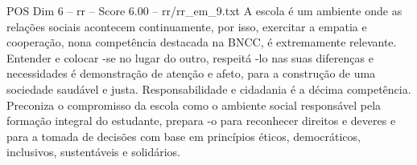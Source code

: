\begin{textsample}{POS Dim 6 – rr – Score 6.00 – rr/rr\_em\_9.txt}
A escola é um ambiente onde as relações sociais acontecem continuamente, por isso, exercitar a empatia e cooperação, nona competência destacada na BNCC, é extremamente relevante.
Entender e colocar -se no lugar do outro, respeitá -lo nas suas diferenças e necessidades é demonstração de atenção e afeto, para a construção de uma sociedade saudável e justa.
Responsabilidade e cidadania é a décima competência.
Preconiza o compromisso da escola como o ambiente social responsável pela formação integral do estudante, prepara -o para reconhecer direitos e deveres e para a tomada de decisões com base em princípios éticos, democráticos, inclusivos, sustentáveis e solidários.

\end{textsample}
